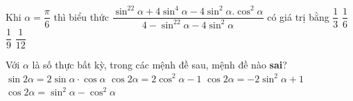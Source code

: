 \begin{ex}%
	Khi  $\alpha=\dfrac{\pi}{6}$ thì biểu thức $\dfrac{\sin ^22\alpha+4\sin ^4\alpha-4\sin ^2\alpha.\cos ^2\alpha}{4-\sin ^22\alpha-4\sin ^2\alpha}$ có giá trị bằng
	\choice 
		 {$\dfrac{1}{3}$}
		 {$\dfrac{1}{6}$}
		{\True  $\dfrac{1}{9}$}
		 {$\dfrac{1}{12}$}
\end{ex}

\begin{ex}%
	Với $\alpha$ là số thực bất kỳ, trong các mệnh đề sau,  mệnh đề nào \textbf{sai}?
	\choice 
		{$\sin 2\alpha =2\sin \alpha \cdot \cos  \alpha$}
		 {$\cos 2\alpha =2\cos^2\alpha-1$}
		 {$\cos 2\alpha =-2\sin^2\alpha+1$}
		{\True $\cos 2\alpha=\sin^2\alpha-\cos^2\alpha$} 
\end{ex}
